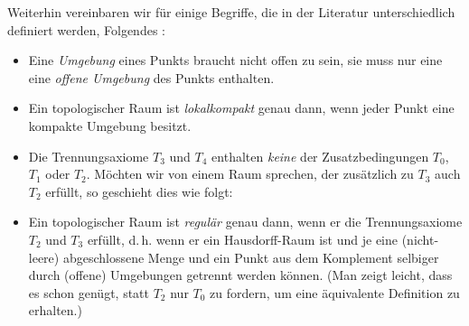\bigskip
Weiterhin vereinbaren wir für einige Begriffe, die in der Literatur
unterschiedlich definiert werden, Folgendes%
:
\begin{itemize}
    \item
        Eine \emph{Umgebung} eines Punkts braucht nicht offen zu sein, sie muss
        nur eine eine \emph{offene Umgebung} des Punkts enthalten.
        
    \item 
        Ein topologischer Raum ist \emph{lokalkompakt} genau dann,
        wenn jeder Punkt eine kompakte Umgebung besitzt.
        
    \item
        Die Trennungsaxiome $T_3$ und $T_4$ enthalten \emph{keine}
        der Zusatzbedingungen $T_0$, $T_1$ oder $T_2$. Möchten wir von einem
        Raum sprechen, der zusätzlich zu $T_3$ auch $T_2$ erfüllt, so geschieht
        dies wie folgt:
        
    \item
        Ein topologischer Raum ist \emph{regulär} genau dann,
        wenn er die Trennungsaxiome $T_2$ und $T_3$ erfüllt, d.\,h. wenn er ein
        Hausdorff-Raum ist und je eine (nicht-leere) abgeschlossene Menge und 
        ein Punkt aus dem Komplement selbiger durch (offene) Umgebungen
        getrennt werden können. (Man zeigt leicht, dass es schon genügt, 
        statt $T_2$ nur $T_0$ zu fordern, um eine äquivalente Definition zu
        erhalten.)
\end{itemize}













